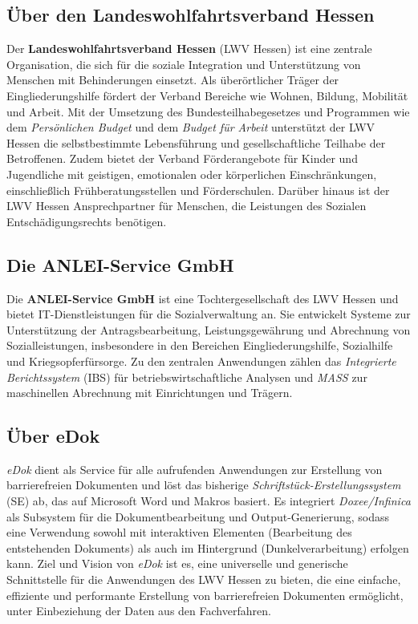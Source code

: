 \documentclass[12pt,oneside]{article}
\begin{document}
\subsection{Über den Landeswohlfahrtsverband Hessen}

Der \textbf{Landeswohlfahrtsverband Hessen} (LWV Hessen) ist eine zentrale Organisation, die sich für die soziale Integration und Unterstützung von Menschen mit Behinderungen einsetzt. Als überörtlicher Träger der Eingliederungshilfe fördert der Verband Bereiche wie Wohnen, Bildung, Mobilität und Arbeit. Mit der Umsetzung des Bundesteilhabegesetzes und Programmen wie dem \textit{Persönlichen Budget} und dem \textit{Budget für Arbeit} unterstützt der LWV Hessen die selbstbestimmte Lebensführung und gesellschaftliche Teilhabe der Betroffenen. Zudem bietet der Verband Förderangebote für Kinder und Jugendliche mit geistigen, emotionalen oder körperlichen Einschränkungen, einschließlich Frühberatungsstellen und Förderschulen. Darüber hinaus ist der LWV Hessen Ansprechpartner für Menschen, die Leistungen des Sozialen Entschädigungsrechts benötigen.

\subsection{Die ANLEI-Service GmbH}

Die \textbf{ANLEI-Service GmbH} ist eine Tochtergesellschaft des LWV Hessen und bietet IT-Dienstleistungen für die Sozialverwaltung an. Sie entwickelt Systeme zur Unterstützung der Antragsbearbeitung, Leistungsgewährung und Abrechnung von Sozialleistungen, insbesondere in den Bereichen Eingliederungshilfe, Sozialhilfe und Kriegsopferfürsorge. Zu den zentralen Anwendungen zählen das \textit{Integrierte Berichtssystem} (IBS) für betriebswirtschaftliche Analysen und \textit{MASS} zur maschinellen Abrechnung mit Einrichtungen und Trägern.

\subsection{Über eDok}

\textit{eDok} dient als Service für alle aufrufenden Anwendungen zur Erstellung von barrierefreien Dokumenten und löst das bisherige \textit{Schriftstück-Erstellungssystem} (SE) ab, das auf Microsoft Word und Makros basiert. Es integriert \textit{Doxee/Infinica} als Subsystem für die Dokumentbearbeitung und Output-Generierung, sodass eine Verwendung sowohl mit interaktiven Elementen (Bearbeitung des entstehenden Dokuments) als auch im Hintergrund (Dunkelverarbeitung) erfolgen kann. Ziel und Vision von \textit{eDok} ist es, eine universelle und generische Schnittstelle für die Anwendungen des LWV Hessen zu bieten, die eine einfache, effiziente und performante Erstellung von barrierefreien Dokumenten ermöglicht, unter Einbeziehung der Daten aus den Fachverfahren.
\end{document}
